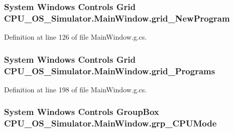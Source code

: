 \subsubsection[{grid\+\_\+\+New\+Program}]{\setlength{\rightskip}{0pt plus 5cm}System Windows Controls Grid C\+P\+U\+\_\+\+O\+S\+\_\+\+Simulator.\+Main\+Window.\+grid\+\_\+\+New\+Program\hspace{0.3cm}{\ttfamily [package]}}\label{class_c_p_u___o_s___simulator_1_1_main_window_a38bef5fa03edcca52fa7fc11068923bd}


Definition at line 126 of file Main\+Window.\+g.\+cs.

\hypertarget{class_c_p_u___o_s___simulator_1_1_main_window_a7a4cb93db4cde3b227cbc3155af574d2}{}
\subsubsection[{grid\+\_\+\+Programs}]{\setlength{\rightskip}{0pt plus 5cm}System Windows Controls Grid C\+P\+U\+\_\+\+O\+S\+\_\+\+Simulator.\+Main\+Window.\+grid\+\_\+\+Programs\hspace{0.3cm}{\ttfamily [package]}}\label{class_c_p_u___o_s___simulator_1_1_main_window_a7a4cb93db4cde3b227cbc3155af574d2}


Definition at line 198 of file Main\+Window.\+g.\+cs.

\hypertarget{class_c_p_u___o_s___simulator_1_1_main_window_a0e549bad0f6778b2ea3fffb6c2d1a2bb}{}
\subsubsection[{grp\+\_\+\+C\+P\+U\+Mode}]{\setlength{\rightskip}{0pt plus 5cm}System Windows Controls Group\+Box C\+P\+U\+\_\+\+O\+S\+\_\+\+Simulator.\+Main\+Window.\+grp\+\_\+\+C\+P\+U\+Mode\hspace{0.3cm}{\ttfamily [package]}}\label{class_c_p_u___o_s___simulator_1_1_main_window_a0e549bad0f6778b2ea3fffb6c2d1a2bb}


